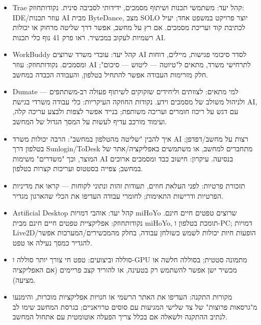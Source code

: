 
\begin{itemize}
  \item Trae קהל יעד: משתמשי תכנות ושיתוף מסמכים, ידידותי לסביבה סינית. נקודותחוזק: IDE/עוזר תכנות AI מבית ByteDance, מצב SOLO יוצר פרויקט במשפט אחד; יעיל לכתיבת קוד ועריכת מסמכים. אם רץ על מחשב, אפשר דרך שליטה מרחוק או יכולות רשמיות לעקוב במכשיר. ראו פרק 41 נוף כלי תכנות AI.
  \item WorkBuddy קהל יעד: עובדי משרד שרוצים AI לסדר סיכומי פגישות, מיילים, דוחות ומסמכים. נקודותחוזק: עוזר AI לתרחישי משרד, מתאים ל"טיוטה — ליטוש — סיכום"; חלק מזרימות העבודה אפשר להתחיל בטלפון, והעבודה הכבדה במחשב.
  \item Dumate — למי מתאים: לצוותים וליחידים שזקוקים לשיתוף פעולה רב-משתתפים ולניהול משולב של מסמכים וידע. נקודות החוזקה העיקריות: כלי עבודה משרדי בגישת AI, עם דגש על ריכוז חומרים ועריכה משותפת; בנייד אפשר לצפות ולבצע עריכה קלה, ועימוד מורכב עדיף לעשות על המסך הגדול של המחשב.
  \item איך להבין "שליטה מהטלפון במחשב": הרבה יכולות משרד AI רצות על מחשב/דפדפן; בטלפון דרך Sunlogin/ToDesk מתחברים למחשב, או משתמשים באפליקציה/אתר של המוצר, וכך "משדרים" משימות AI בנסיעה. עיקרון: חישוב כבד ומסמכים ארוכים במחשב; צפייה בסטטוס ועריכות קצרות בטלפון.
  \item תזכורת פרטיות: לפני העלאת חוזים, תעודות זהות ונתוני לקוחות — קראו את מדיניות הפרטיות ודרישות התאימות; לחומרי עבודה העדיפו את הכלי שהארגון מגדיר.
\end{itemize}


\begin{itemize}
  \item Artificial Desktop קהל יעד: אוהבי דמויות miHoYo שרוצים טפטים חיים חינם. נקודותחוזק: אפליקציית טפטים חיים חינם מבית miHoYo, תומכת בטלפון ו-PC; דמויות Live2D/הופעות חיות יכולות לשמש כשולחן עבודה, בחלק מהמכשירים/המערכות אפשר להגדיר כמסך נעילה או טפט.
  \item סוללה וביצועים: טפט חי צורך יותר סוללה ו-GPU מתמונה סטטית; בסוללה חלשה או מכשיר ישן אפשר להשתמש רק בטעינה, או להוריד קצב פריימים (אם האפליקציה מציעה).
  \item מקורות התקנה: העדיפו את האתר הרשמי או חנויות אפליקציות מוכרות, והימנעו מ"גרסאות פרוצות" של צד שלישי המגיעות עם סוסים טרויאניים; בגרסת המחשב שימו לב לנתיב ההתקנה ולשאלה אם בכלל צריך הפעלה אוטומטית עם אתחול המחשב.
\end{itemize}

